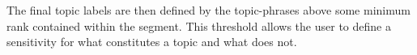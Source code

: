     The final topic labels are then defined by the topic-phrases above some minimum rank contained within the segment. This threshold allows the user to define a sensitivity for what constitutes a topic and what does not.
    
